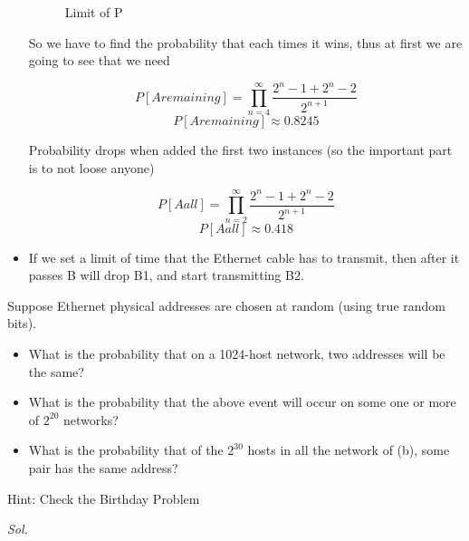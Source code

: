 \documentclass{assignment}
\begin{document}
\begin{itemize}
\begin{figure}[h]
\begin{center}
    \end{center}
    \caption{Limit of P}
    \label{fig:}
    \end{figure}
    So we have to find the probability that each times it wins, thus at first we
    are going to see that we need 

    $$ P[A remaining] = \prod_{n=4}^{\infty}  \frac{2^{n}-1 + 2^{n}-2}{2^{n+1}}$$
    $$ P[A remaining] \approx 0.8245$$

    Probability drops when added the first two instances (so the important part
    is to not loose anyone)

    $$ P[A all] = \prod_{n=2}^{\infty}  \frac{2^{n}-1 + 2^{n}-2}{2^{n+1}}$$
    $$ P[A all] \approx 0.418$$

  \item If we set a limit of time that the Ethernet cable has to transmit, then
    after it passes B will drop B1, and start transmitting B2.
\end{itemize}

\newpage
\begin{ex}
  Suppose Ethernet physical addresses are chosen at random (using true random bits).
  \begin{itemize}
  \item  What is the probability that on a 1024-host network, two addresses will be the same?
  \item  What is the probability that the above event will occur on some one
    or more of $2^{20}$ networks?
  \item  What is the probability that of the $2^{30}$ hosts in all the network of (b), some pair has the
  same address?
  \end{itemize}
  Hint: Check the Birthday Problem
\end{ex}
\textit{ Sol. }
\end{document}
